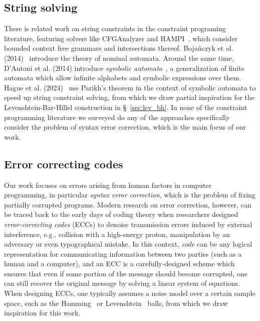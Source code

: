 \documentclass[runningheads]{llncs}
\begin{document}
  \subsection{String solving}

  There is related work on string constraints in the constraint programing literature, featuring solvers like CFGAnalyzer and HAMPI~\cite{kiezun2009hampi}, which consider bounded context free grammars and intersections thereof. Boja{\'n}czyk et al. (2014)~\cite{bojanczyk2014automata} introduce the theory of nominal automata. Around the same time, D'Antoni et al. (2014) introduce \textit{symbolic automata}~\cite{dantoni2014minimization}, a generalization of finite automata which allow infinite alphabets and symbolic expressions over them. Hague et al. (2024)~\cite{hague2024parikh} use Parikh's theorem in the context of symbolic automata to speed up string constraint solving, from which we draw partial inspiration for the Levenshtein-Bar-Hillel construction in \S~\ref{sec:lev_bh}. In none of the constraint programming literature we surveyed do any of the approaches specifically consider the problem of syntax error correction, which is the main focus of our work.

  \subsection{Error correcting codes}

  Our work focuses on errors arising from human factors in computer programming, in particular \textit{syntax error correction}, which is the problem of fixing partially corrupted programs. Modern research on error correction, however, can be traced back to the early days of coding theory when researchers designed \textit{error-correcting codes} (ECCs) to denoise transmission errors induced by external interference, e.g., collision with a high-energy proton, manipulation by an adversary or even typographical mistake. In this context, \textit{code} can be any logical representation for communicating information between two parties (such as a human and a computer), and an ECC is a carefully-designed scheme which ensures that even if some portion of the message should become corrupted, one can still recover the original message by solving a linear system of equations. When designing ECCs, one typically assumes a noise model over a certain sample space, such as the Hamming~\cite{titsias2017hamming,dong2023number} or Levenshtein~\cite{levenshtein1966binary,becerra2008learning,barlev2021levenshtein} balls, from which we draw inspiration for this work.
\end{document}
